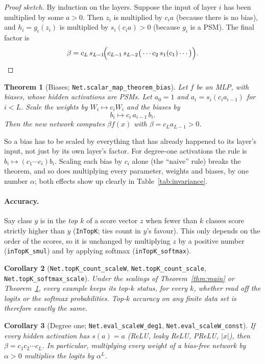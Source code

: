 \documentclass[11pt]{article}
\newtheorem{theorem}{Theorem}
\newtheorem{corollary}[theorem]{Corollary}
\theoremstyle{definition}
\theoremstyle{remark}
\newcommand{\lean}[1]{\texttt{\color{black!70}#1}}
\begin{document}
\begin{proof}[Proof sketch]
By induction on the layers. Suppose the input of layer $i$ has been multiplied by some $a>0$. Then
$z_i$ is multiplied by $c_i a$ (because there is no bias), and $h_i=g_i(z_i)$ is multiplied by
$s_i(c_i a)>0$ (because $g_i$ is a PSM). The final factor is
\[
  \beta = c_L\, s_{L-1}\!\Big(c_{L-1}\, s_{L-2}\big(\cdots c_2\, s_1(c_1)\cdots\big)\Big). \qedhere
\]
\end{proof}

\begin{theorem}[Biases; \lean{Net.scalar\_map\_theorem\_bias}]\label{thm:bias}
Let $f$ be an MLP, with biases, whose hidden activations are PSMs. Let $a_0=1$ and
$a_i = s_i(c_i a_{i-1})$ for $i<L$. Scale the weights by $W_i\mapsto c_iW_i$ and the biases by
\[
  b_i \mapsto c_i\, a_{i-1}\, b_i .
\]
Then the new network computes $\beta f(x)$ with $\beta = c_L a_{L-1} > 0$.
\end{theorem}

So a bias has to be scaled by everything that has already happened to its layer's input, not just
by its own layer's factor. For degree-one activations the rule is $b_i\mapsto(c_1\cdots c_i)b_i$.
Scaling each bias by $c_i$ alone (the ``naive'' rule) breaks the theorem, and so does multiplying
every parameter, weights and biases, by one number $\alpha$; both effects show up clearly in
Table~\ref{tab:invariance}.

\paragraph{Accuracy.}
Say class $y$ is in the \emph{top $k$} of a score vector $z$ when fewer than $k$ classes score
strictly higher than $y$ (\lean{InTopK}; ties count in $y$'s favour). This only depends on the order
of the scores, so it is unchanged by multiplying $z$ by a positive number (\lean{inTopK\_smul}) and
by applying softmax (\lean{inTopK\_softmax}).

\begin{corollary}[\lean{Net.topK\_count\_scaleW}, \lean{Net.topK\_count\_scale},
\lean{Net.topK\_softmax\_scale}]
Under the scalings of Theorem~\ref{thm:main} or Theorem~\ref{thm:bias}, every example keeps its
top-$k$ status, for every $k$, whether read off the logits or the softmax probabilities. Top-$k$
accuracy on any finite data set is therefore exactly the same.
\end{corollary}

\begin{corollary}[Degree one; \lean{Net.eval\_scaleW\_deg1}, \lean{Net.eval\_scaleW\_const}]
If every hidden activation has $s(a)=a$ (ReLU, leaky ReLU, PReLU, $|x|$), then
$\beta=c_1c_2\cdots c_L$. In particular, multiplying every weight of a bias-free network by
$\alpha>0$ multiplies the logits by $\alpha^L$.
\end{corollary}
\end{document}
